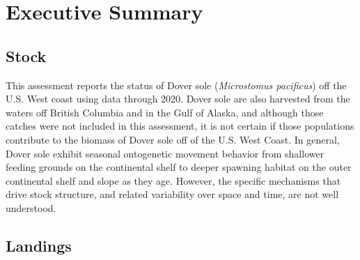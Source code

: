 \documentclass[11pt,
  english,
  a4paper,
]{article}
\begin{document}
\newpage


\hypertarget{executive-summary}{%
\section*{Executive Summary}\label{executive-summary}}

\leavevmode\tagmcend\tagstructend


\hypertarget{stock}{%
\subsection*{Stock}\label{stock}}

\leavevmode\tagmcend\tagstructend


This assessment reports the status of Dover sole (\emph{Microstomus pacificus}) off the U.S. West coast using data through 2020. Dover sole are also harvested from the waters off British Columbia and in the Gulf of Alaska, and although those catches were not included in this assessment, it is not certain if those populations contribute to the biomass of Dover sole off of the U.S. West Coast. In general, Dover sole exhibit seasonal ontogenetic movement behavior from shallower feeding grounds on the continental shelf to deeper spawning habitat on the outer continental shelf and slope as they age. However, the specific mechanisms that drive stock structure, and related variability over space and time, are not well understood.

\leavevmode\tagmcend\tagstructend\par


\hypertarget{landings}{%
\subsection*{Landings}\label{landings}}

\leavevmode\tagmcend\tagstructend

\end{document}
